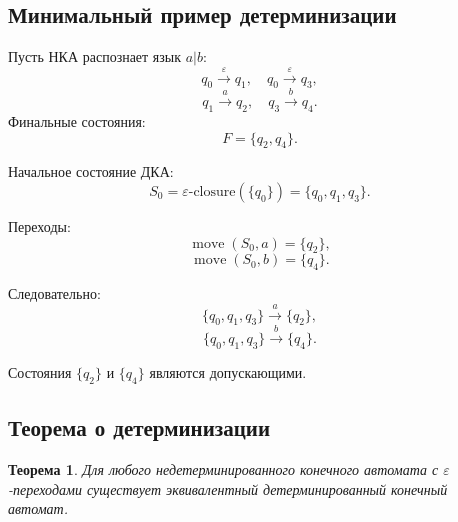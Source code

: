 \documentclass[12pt,a4paper]{article}
\newtheorem{theorem}{Теорема}
\begin{document}
\subsection{Минимальный пример детерминизации}

Пусть НКА распознает язык $a|b$:
\[
q_0 \xrightarrow{\varepsilon} q_1,\quad
q_0 \xrightarrow{\varepsilon} q_3,
\]
\[
q_1 \xrightarrow{a} q_2,\quad
q_3 \xrightarrow{b} q_4.
\]
Финальные состояния:
\[
F = \{q_2,q_4\}.
\]

Начальное состояние ДКА:
\[
S_0 = \varepsilon\text{-closure}(\{q_0\}) = \{q_0,q_1,q_3\}.
\]

Переходы:
\[
\operatorname{move}(S_0,a)=\{q_2\},
\]
\[
\operatorname{move}(S_0,b)=\{q_4\}.
\]

Следовательно:
\[
\{q_0,q_1,q_3\} \xrightarrow{a} \{q_2\},
\]
\[
\{q_0,q_1,q_3\} \xrightarrow{b} \{q_4\}.
\]

Состояния $\{q_2\}$ и $\{q_4\}$ являются допускающими.

\subsection{Теорема о детерминизации}

\begin{theorem}
Для любого недетерминированного конечного автомата с $\varepsilon$-переходами существует эквивалентный детерминированный конечный автомат.
\end{theorem}
\end{document}
